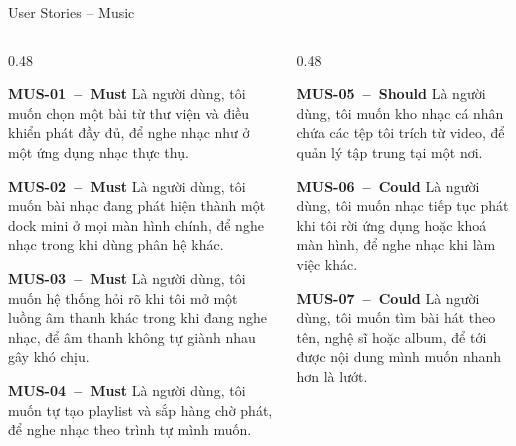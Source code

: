 \documentclass[aspectratio=169]{beamer}
\begin{document}
\begin{frame}{User Stories -- Music}
  \begin{columns}
    \begin{column}{0.48\textwidth}
      \begin{block}{\scriptsize\bfseries MUS-01~--~Must}
        {\tiny Là người dùng, tôi muốn chọn một bài từ thư viện và điều khiển phát đầy đủ, để nghe nhạc như ở một ứng dụng nhạc thực thụ.}
      \end{block}
      \begin{block}{\scriptsize\bfseries MUS-02~--~Must}
        {\tiny Là người dùng, tôi muốn bài nhạc đang phát hiện thành một dock mini ở mọi màn hình chính, để nghe nhạc trong khi dùng phân hệ khác.}
      \end{block}
      \begin{block}{\scriptsize\bfseries MUS-03~--~Must}
        {\tiny Là người dùng, tôi muốn hệ thống hỏi rõ khi tôi mở một luồng âm thanh khác trong khi đang nghe nhạc, để âm thanh không tự giành nhau gây khó chịu.}
      \end{block}
      \begin{block}{\scriptsize\bfseries MUS-04~--~Must}
        {\tiny Là người dùng, tôi muốn tự tạo playlist và sắp hàng chờ phát, để nghe nhạc theo trình tự mình muốn.}
      \end{block}
    \end{column}
    \begin{column}{0.48\textwidth}
      \begin{block}{\scriptsize\bfseries MUS-05~--~Should}
        {\tiny Là người dùng, tôi muốn kho nhạc cá nhân chứa các tệp tôi trích từ video, để quản lý tập trung tại một nơi.}
      \end{block}
      \begin{block}{\scriptsize\bfseries MUS-06~--~Could}
        {\tiny Là người dùng, tôi muốn nhạc tiếp tục phát khi tôi rời ứng dụng hoặc khoá màn hình, để nghe nhạc khi làm việc khác.}
      \end{block}
      \begin{block}{\scriptsize\bfseries MUS-07~--~Could}
        {\tiny Là người dùng, tôi muốn tìm bài hát theo tên, nghệ sĩ hoặc album, để tới được nội dung mình muốn nhanh hơn là lướt.}
      \end{block}
    \end{column}
  \end{columns}
\end{frame}
\end{document}

